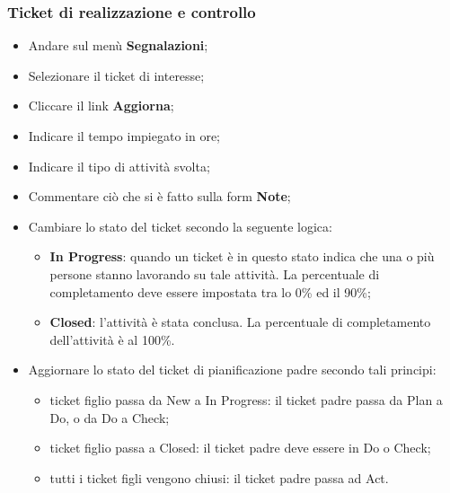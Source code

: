 \documentclass[a4paper,12pt]{article}
\begin{document}
{\subsubsection{Ticket di realizzazione e controllo}
{ 
\begin{itemize}
\item Andare sul menù \textbf{Segnalazioni}; 
\item Selezionare il ticket di interesse; 
\item Cliccare il link \textbf{Aggiorna}; 
\item Indicare il tempo impiegato in ore; 
\item Indicare il tipo di attività svolta; 
\item Commentare ciò che si è fatto sulla form \textbf{Note}; 
\item Cambiare lo stato del ticket secondo la seguente logica: 
		\begin{itemize}
		\item \textbf{In Progress}: quando un ticket è in questo stato indica che una o più persone 
		stanno lavorando su tale attività. La percentuale di completamento deve 
		essere impostata tra lo 0\% ed il 90\%; 
		\item \textbf{Closed}: l’attività è stata conclusa. La percentuale di completamento dell’attività è al 100\%. 
		 
		\end{itemize} 
\item Aggiornare lo stato del ticket di pianificazione padre secondo tali principi: 
		\begin{itemize}
		\item ticket figlio passa da New a In Progress: il ticket padre passa da Plan a Do, 
		o da Do a Check; 
		\item ticket figlio passa a Closed: il ticket padre deve essere in Do o Check; 
		\item tutti i ticket figli vengono chiusi: il ticket padre passa ad Act.
		\end{itemize}

\end{itemize}

}

}
\end{document}
